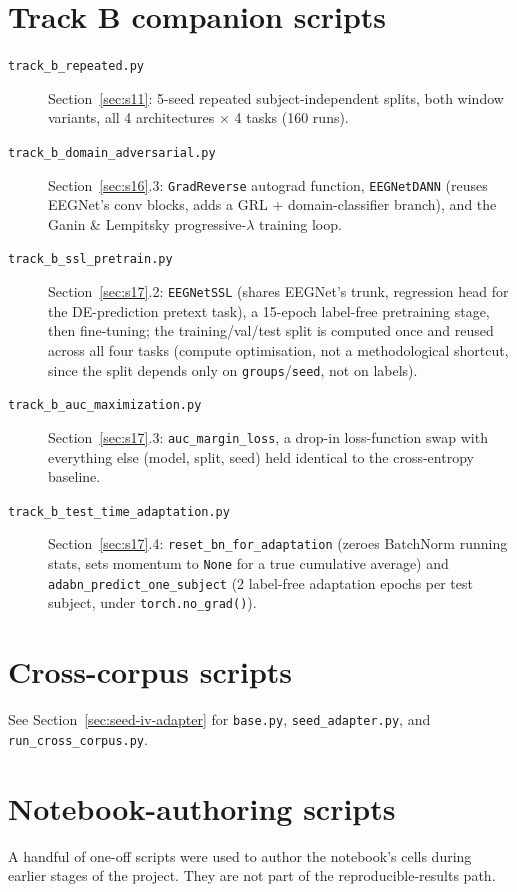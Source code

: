 \documentclass[11pt]{report}
\begin{document}
\section{Track B companion scripts}
\begin{description}
  \item[\texttt{track\_b\_repeated.py}] Section~\ref{sec:s11}: 5-seed
        repeated subject-independent splits, both window variants, all 4
        architectures $\times$ 4 tasks (160 runs).
  \item[\texttt{track\_b\_domain\_adversarial.py}] Section~\ref{sec:s16}.3:
        \texttt{GradReverse} autograd function, \texttt{EEGNetDANN} (reuses
        EEGNet's conv blocks, adds a GRL + domain-classifier branch), and
        the Ganin \& Lempitsky progressive-$\lambda$ training loop.
  \item[\texttt{track\_b\_ssl\_pretrain.py}] Section~\ref{sec:s17}.2:
        \texttt{EEGNetSSL} (shares EEGNet's trunk, regression head for the
        DE-prediction pretext task), a 15-epoch label-free pretraining
        stage, then fine-tuning; the training/val/test split is computed
        once and reused across all four tasks (compute optimisation, not a
        methodological shortcut, since the split depends only on
        \texttt{groups}/\texttt{seed}, not on labels).
  \item[\texttt{track\_b\_auc\_maximization.py}] Section~\ref{sec:s17}.3:
        \texttt{auc\_margin\_loss}, a drop-in loss-function swap with
        everything else (model, split, seed) held identical to the
        cross-entropy baseline.
  \item[\texttt{track\_b\_test\_time\_adaptation.py}] Section~\ref{sec:s17}.4:
        \texttt{reset\_bn\_for\_adaptation} (zeroes BatchNorm running stats,
        sets momentum to \texttt{None} for a true cumulative average) and
        \texttt{adabn\_predict\_one\_subject} (2 label-free adaptation
        epochs per test subject, under \texttt{torch.no\_grad()}).
\end{description}

\section{Cross-corpus scripts}
See Section~\ref{sec:seed-iv-adapter} for \texttt{base.py},
\texttt{seed\_adapter.py}, and \texttt{run\_cross\_corpus.py}.

\section{Notebook-authoring scripts}
A handful of one-off scripts were used to author the notebook's cells during
earlier stages of the project. They are not part of the reproducible-results
path.
\end{document}
